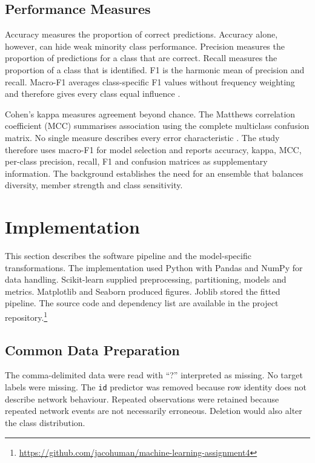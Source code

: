 \documentclass[conference]{IEEEtran}
\begin{document}
\subsection{Performance Measures}

Accuracy measures the proportion of correct predictions. Accuracy alone, however, can hide weak minority class performance. Precision measures the proportion of predictions for a class that are correct. Recall measures the proportion of a class that is identified. F1 is the harmonic mean of precision and recall. Macro-F1 averages class-specific F1 values without frequency weighting and therefore gives every class equal influence \cite{sokolova2009systematic}.

Cohen's kappa measures agreement beyond chance. The Matthews correlation coefficient (MCC) summarises association using the complete multiclass confusion matrix. No single measure describes every error characteristic \cite{rainio2024evaluation}. The study therefore uses macro-F1 for model selection and reports accuracy, kappa, MCC, per-class precision, recall, F1 and confusion matrices as supplementary information. The background establishes the need for an ensemble that balances diversity, member strength and class sensitivity.

\section{Implementation}

This section describes the software pipeline and the model-specific transformations. The implementation used Python with Pandas and NumPy for data handling. Scikit-learn supplied preprocessing, partitioning, models and metrics. Matplotlib and Seaborn produced figures. Joblib stored the fitted pipeline. The source code and dependency list are available in the project repository.\footnote{\url{https://github.com/jacohuman/machine-learning-assignment4}}

\subsection{Common Data Preparation}

The comma-delimited data were read with ``?'' interpreted as missing. No target labels were missing. The \texttt{id} predictor was removed because row identity does not describe network behaviour. Repeated observations were retained because repeated network events are not necessarily erroneous. Deletion would also alter the class distribution.
\end{document}
